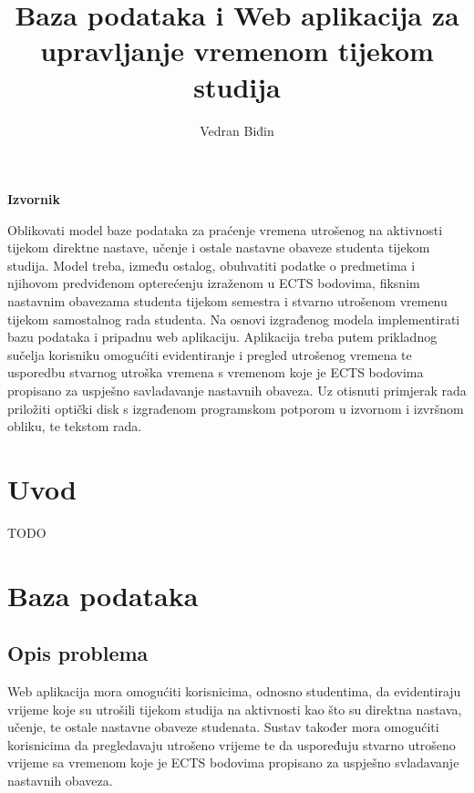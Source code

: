 \documentclass[times, utf8, zavrsni, numeric]{fer}
\begin{document}

\title{Baza podataka i Web aplikacija za upravljanje vremenom tijekom studija}

\author{Vedran Biđin}

\maketitle

\textbf{Izvornik}\\\hspace*{\fill}

Oblikovati model baze podataka za praćenje vremena utrošenog na aktivnosti tijekom direktne nastave, učenje i ostale nastavne obaveze studenta tijekom studija. Model treba, između ostalog, obuhvatiti podatke o predmetima i njihovom predviđenom opterećenju izraženom u ECTS bodovima, fiksnim nastavnim obavezama studenta tijekom semestra i stvarno utrošenom vremenu tijekom samostalnog rada studenta. Na osnovi izgrađenog modela implementirati bazu podataka i pripadnu web aplikaciju. Aplikacija treba putem prikladnog sučelja korisniku omogućiti evidentiranje i pregled utrošenog vremena te usporedbu stvarnog utroška vremena s vremenom koje je ECTS bodovima propisano za uspješno savladavanje nastavnih obaveza. Uz otisnuti primjerak rada priložiti optički disk s izgrađenom programskom potporom u izvornom i izvršnom obliku, te tekstom rada.

\zahvala{}

\tableofcontents

\chapter{Uvod}
TODO

\chapter{Baza podataka}

\section{Opis problema}
Web aplikacija mora omogućiti korisnicima, odnosno studentima, da evidentiraju vrijeme koje su utrošili tijekom studija na aktivnosti kao što su direktna nastava, učenje, te ostale nastavne obaveze studenata. Sustav također mora omogućiti korisnicima da pregledavaju utrošeno vrijeme te da uspoređuju stvarno utrošeno vrijeme sa vremenom koje je ECTS bodovima propisano za uspješno svladavanje nastavnih obaveza.
\end{document}
